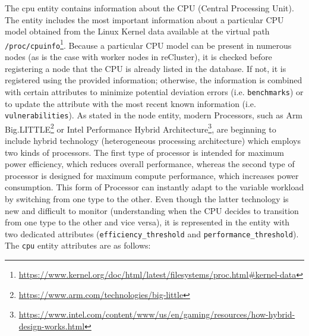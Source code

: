 The cpu entity contains information about the CPU (Central Processing Unit).
\newline
The entity includes the most important information about a particular CPU model
obtained from the Linux Kernel data available at the virtual path \texttt{/proc/cpuinfo}\footnote{\url{https://www.kernel.org/doc/html/latest/filesystems/proc.html\#kernel-data}}.
\newline
Because a particular CPU model can be present in numerous nodes (as is the case
with worker nodes in reCluster), it is checked before registering a node that
the CPU is already listed in the database. If not, it is registered using the
provided information; otherwise, the information is combined with certain
attributes to minimize potential deviation errors (i.e. \texttt{benchmarks}) or
to update the attribute with the most recent known information (i.e. \texttt{vulnerabilities}).
\newline
As stated in the node entity, modern Processors, such as Arm Big.LITTLE\footnote{\url{https://www.arm.com/technologies/big-little}}
or Intel Performance Hybrid Architecture\footnote{\url{https://www.intel.com/content/www/us/en/gaming/resources/how-hybrid-design-works.html}},
are beginning to include hybrid technology (heterogeneous processing architecture)
which employs two kinds of processors. The first type of processor is intended for
maximum power efficiency, which reduces overall performance, whereas the second type
of processor is designed for maximum compute performance, which increases power
consumption. This form of Processor can instantly adapt to the variable workload
by switching from one type to the other\cite{cpu_arm}\cite{cpu_intel}. Even
though the latter technology is new and difficult to monitor (understanding when
the CPU decides to transition from one type to the other and vice versa), it is represented
in the entity with two dedicated attributes (\texttt{efficiency\_threshold} and \texttt{performance\_threshold}).
\newline
The \texttt{cpu} entity attributes are as follows:

